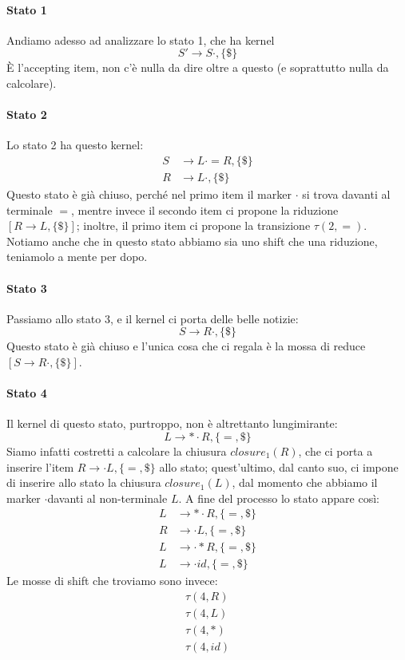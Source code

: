 \documentclass[class=book, crop=false, oneside, 12pt]{standalone}
\begin{document}
\paragraph{Stato 1}
Andiamo adesso ad analizzare lo stato 1, che ha kernel 
\begin{equation*}
    S' \to S\cdot, \{\$\}    
\end{equation*}
È l'accepting item, non c'è nulla da dire oltre a questo (e soprattutto nulla da calcolare).

\paragraph{Stato 2}
Lo stato 2 ha questo kernel:
\begin{align*}
    S &\to L \cdot = R, \{\$\} \\
    R &\to L \cdot, \{\$\}
\end{align*}
Questo stato è già chiuso, perché nel primo item il marker \(\cdot\) si trova davanti al terminale \(=\), mentre invece il secondo item ci propone la riduzione \([R \to L, \{\$\}]\); inoltre, il primo item ci propone la transizione \(\tau(2, =)\). Notiamo anche che in questo stato abbiamo sia uno shift che una riduzione, teniamolo a mente per dopo.

\paragraph{Stato 3}
Passiamo allo stato 3, e il kernel ci porta delle belle notizie:
\begin{equation*}
    S \to R\cdot, \{\$\}    
\end{equation*}
Questo stato è già chiuso e l'unica cosa che ci regala è la mossa di reduce \([S \to R\cdot, \{\$\}]\).

\paragraph{Stato 4}
Il kernel di questo stato, purtroppo, non è altrettanto lungimirante:
\begin{equation*}
    L \to \ast \cdot R, \{=, \$\}
\end{equation*}
Siamo infatti costretti a calcolare la chiusura \(closure_1(R)\), che ci porta a inserire l'item \(R \to \cdot L, \{=, \$\}\) allo stato; quest'ultimo, dal canto suo, ci impone di inserire allo stato la chiusura \(closure_1(L)\), dal momento che abbiamo il marker \(\cdot\)davanti al non-terminale \(L\). A fine del processo lo stato appare così:
\begin{align*}
    L &\to \ast \cdot R, \{=, \$\} \\
    R &\to \cdot L, \{=, \$\} \\
    L &\to \cdot \ast R, \{=, \$\} \\
    L &\to \cdot id, \{=, \$\} 
\end{align*}
Le mosse di shift che troviamo sono invece:
\begin{gather*}
    \tau(4, R) \\
    \tau(4, L) \\
    \tau(4, \ast) \\
    \tau(4, id)
\end{gather*}
\end{document}
